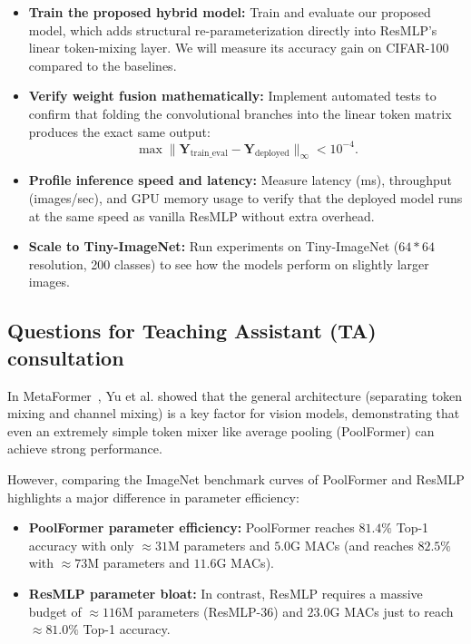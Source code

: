 \begin{itemize}[leftmargin=1.5em]
    \item \textbf{Train the proposed hybrid model:} Train and evaluate our proposed model, which adds structural re-parameterization directly into ResMLP's linear token-mixing layer. We will measure its accuracy gain on CIFAR-100 compared to the baselines.
    \item \textbf{Verify weight fusion mathematically:} Implement automated tests to confirm that folding the convolutional branches into the linear token matrix produces the exact same output:
    \begin{equation}
        \max \|\mathbf{Y}_{\text{train\_eval}} - \mathbf{Y}_{\text{deployed}}\|_{\infty} < 10^{-4}.
    \end{equation}
    \item \textbf{Profile inference speed and latency:} Measure latency (ms), throughput (images/sec), and GPU memory usage to verify that the deployed model runs at the same speed as vanilla ResMLP without extra overhead.
    \item \textbf{Scale to Tiny-ImageNet:} Run experiments on Tiny-ImageNet ($64 * 64$ resolution, 200 classes) to see how the models perform on slightly larger images.
\end{itemize}

\subsection{Questions for Teaching Assistant (TA) consultation}
In MetaFormer~\cite{yu2022metaformer}, Yu et al. showed that the general architecture (separating token mixing and channel mixing) is a key factor for vision models, demonstrating that even an extremely simple token mixer like average pooling (PoolFormer) can achieve strong performance.

However, comparing the ImageNet benchmark curves of PoolFormer and ResMLP highlights a major difference in parameter efficiency:
\begin{itemize}[leftmargin=1.5em]
    \item \textbf{PoolFormer parameter efficiency:} PoolFormer reaches $81.4\%$ Top-1 accuracy with only $\approx 31\text{M}$ parameters and $5.0\text{G}$ MACs (and reaches $82.5\%$ with $\approx 73\text{M}$ parameters and $11.6\text{G}$ MACs).
    \item \textbf{ResMLP parameter bloat:} In contrast, ResMLP requires a massive budget of $\approx 116\text{M}$ parameters (ResMLP-36) and $23.0\text{G}$ MACs just to reach $\approx 81.0\%$ Top-1 accuracy.
\end{itemize}

